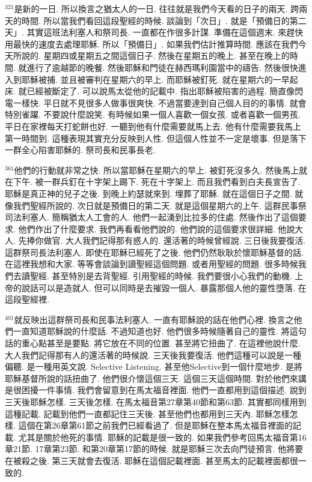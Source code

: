 \documentclass{book}
\begin{document}
$^{321}$是新的一日.
所以換言之猶太人的一日.
往往就是我們今天看的日子的兩天.
跨兩天的時間.
所以當我們看回這段聖經的時候.
談論到「次日」.
就是「預備日的第二天」.
其實這班法利塞人和祭司長.
一直都在作很多計謀.
準備在這個週末.
來趕快用最快的速度去處理耶穌.
所以「預備日」.
如果我們估計推算時間.
應該在我們今天所說的.
星期四或星期五之間這個日子.
然後在星期五的晚上.
甚至在晚上的時間.
就進行了逾越節的晚餐.
然後耶穌和門徒在赫西瑪利園當中的禱告.
然後很快進入到耶穌被捕.
並且被審判在星期六的早上.
而耶穌被釘死.
就在星期六的一早起床.
就已經被斷定了.
可以說馬太從他的記載中.
指出耶穌被陷害的過程.
簡直像閃電一樣快.
平日就不見很多人做事很爽快.
不過當要達到自己個人目的的事情.
就會特別雀躍.
不要說什麼說笑.
有時候如果一個人喜歡一個女孩.
或者喜歡一個男孩.
平日在家裡每天打蛇餅也好.
一聽到他有什麼需要就馬上去.
他有什麼需要我馬上第一時間到.
這種表現其實充分反映到人性.
但這個人性並不一定是壞事.
但是落下一群全心陷害耶穌的.
祭司長和民事長老.

$^{361}$他們的行動就非常之快.
所以當耶穌在星期六的早上.
被釘死沒多久.
然後馬上就在下午.
被一群兵釘在十字架上踢下.
死在十字架上.
而且我們看到白夫長宣告了.
耶穌是真正神的兒子之後.
到晚上約瑟就來到.
埋葬了耶穌.
就在這個日子之間.
就像我們聖經所說的.
次日就是預備日的第二天.
就是這個星期六的上午.
這群民事祭司法利塞人.
簡稱猶太人工會的人.
他們一起湧到比拉多的住處.
然後作出了這個要求.
他們作出了什麼要求.
我們再看看他們說的.
他們說的這個要求很詳細.
他說大人.
先捧你做官.
大人我們記得那有惑人的.
還活著的時候曾經說.
三日後我要復活.
這群祭司長法利塞人.
即使在耶穌已經死了之後.
他們仍然耿耿於懷耶穌基督的話.
在這裡我想和大家.
等等會談論到讀聖經這個問題.
或者用聖經的問題.
很多時候我們去讀聖經.
甚至特別是去背聖經.
引用聖經的時候.
我們要很小心我們的動機.
上帝的說話可以是造就人.
但可以同時是去摧毀一個人.
暴露那個人他的靈性墮落.
在這段聖經裡.

$^{401}$就反映出這群祭司長和民事法利塞人.
一直有耶穌說的話在他們心裡.
換言之他們一直知道耶穌說的什麼話.
不過知道也好.
他們很多時候隨著自己的靈性.
將這句話的重心點甚至是要點.
將它放在不同的位置.
甚至將它扭曲了.
在這裡他說什麼.
大人我們記得那有人的還活著的時候說.
三天後我要復活.
他們這種可以說是一種偏聽.
是一種用英文說.
Selective Listening.
甚至他Selective到一個什麼地步.
是將耶穌基督所說的話扭曲了.
他們很介懷這個三天.
這個三天這個時間.
對於他們來講是很困擾一件事情.
我們會留意到在馬太福音裡面.
他們一直都用到這個描述.
說到三天後耶穌怎樣.
三天後怎樣.
在馬太福音第27章第40節和第63節.
其實都同樣用到這種記載.
記載到他們一直都記住三天後.
甚至他們也都用到三天內.
耶穌怎樣怎樣.
這個在第26章第61節之前我們已經看過了.
但是耶穌在整本馬太福音裡面的記載.
尤其是關於他死的事情.
耶穌的記載是很一致的.
如果我們參考回馬太福音第16章21節.
17章第23節.
和第20章第17節的時候.
就是耶穌三次去向門徒預言.
他將要在被殺之後.
第三天就會去復活.
耶穌在這個記載裡面.
甚至馬太的記載裡面都很一致的.
\end{document}
